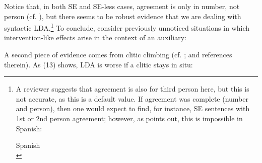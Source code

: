 \documentclass[output=paper]{langsci/langscibook}
\begin{document}
Notice that, in both SE and SE-less cases, agreement is only in number, not person (cf. \citealt{Etxepare2005}), but there seems to be robust evidence that we are dealing with syntactic LDA.\footnote{%
    A reviewer suggests that agreement is also for third person here, but this is not accurate, as this is a default value. If agreement was complete (number and person), then one would expect to find, for instance, SE sentences with 1st or 2nd person agreement; however, as \citet{López2007} points out, this is impossible in Spanish:
    
    \ea Spanish \citep[127]{López2007}\\
    \z
    \z{}} 
To conclude, consider previously unnoticed situations in which intervention-like effects arise in the context of an auxiliary: 

\ea%
    \label{ex:gallego:12}
    \z
\z

A second piece of evidence comes from clitic climbing (cf. \citealt{Gallego2016,Paradís2016}; and references therein). As (13) shows, LDA is worse if a clitic stays in situ:
\end{document}
